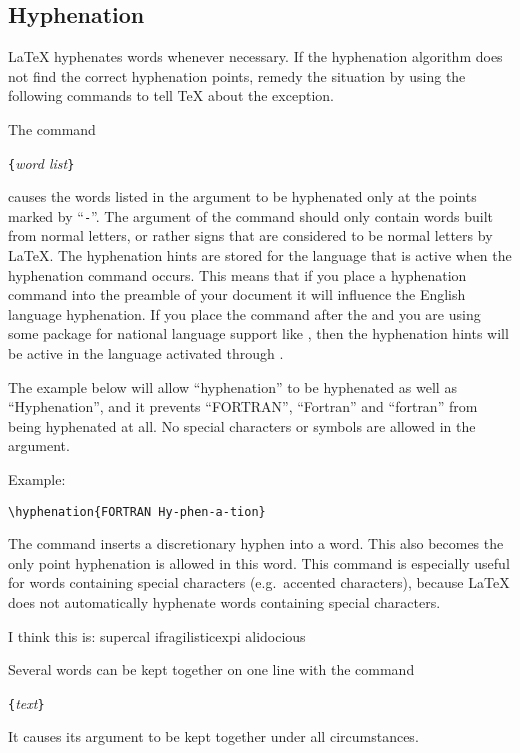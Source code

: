 \subsection{Hyphenation} \label{hyph}

\LaTeX{} hyphenates words whenever necessary. If the hyphenation
algorithm does not find the correct hyphenation points,
remedy the situation by using the following commands to tell \TeX{}
about the exception.

The command
\begin{lscommand}
\verb|{|\emph{word list}\verb|}|
\end{lscommand}
\noindent causes the words listed in the argument to be hyphenated only at
the points marked by ``\verb|-|''.  The argument of the command should only
contain words built from normal letters, or rather signs that are considered
to be normal letters by \LaTeX{}. The hyphenation hints are
stored for the language that is active when the hyphenation command
occurs. This means that if you place a hyphenation command into the preamble
of your document it will influence the English language hyphenation. If you
place the command after the \verb|| and you are using some
package for national language support like , then the hyphenation
hints will be active in the language activated through .

The example below will allow ``hyphenation'' to be hyphenated as well as
``Hyphenation'', and it prevents ``FORTRAN'', ``Fortran'' and ``fortran''
from being hyphenated at all.  No special characters or symbols are allowed
in the argument.

Example:
\begin{code}
\verb|\hyphenation{FORTRAN Hy-phen-a-tion}|
\end{code}

The command \ci{-} inserts a discretionary hyphen into a word. This
also becomes the only point hyphenation is allowed in this word. This
command is especially useful for words containing special characters
(e.g.\ accented characters), because \LaTeX{} does not automatically
hyphenate words containing special characters.

\begin{example}
I think this is: su\-per\-cal\-%
i\-frag\-i\-lis\-tic\-ex\-pi\-%
al\-i\-do\-cious
\end{example}

Several words can be kept together on one line with the command
\begin{lscommand}
\verb|{|\emph{text}\verb|}|
\end{lscommand}
\noindent It causes its argument to be kept together under all circumstances.

